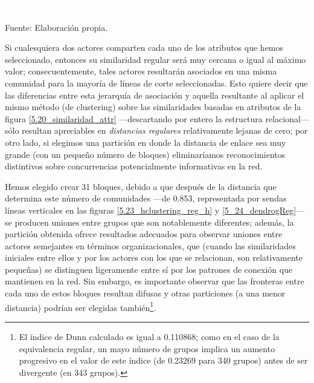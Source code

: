 \documentclass[letterpaper, 11pt]{book}
\theoremstyle{definition}
\theoremstyle{remark}
\begin{document}
\pagebreak
\hspace{-1em}\begin{minipage}{\linewidth}
\centering
{} \label{5_24_dendrogReg}

\includegraphics[scale=0.1]{img/null.png}
\vspace{53em}
\par\bigskip
\small Fuente: Elaboración propia.
\end{minipage}\bigskip



Si cualesquiera dos actores comparten cada uno de los atributos que hemos seleccionado, entonces su similaridad regular será muy cercana o igual al máximo valor; consecuentemente, tales actores resultarán asociados en una misma comunidad para la mayoría de líneas de corte seleccionadas. 
Esto quiere decir que las diferencias entre esta jerarquía de asociación y aquella resultante al aplicar el mismo método (de clustering) sobre las similaridades basadas en atributos de la figura \ref{5.20_similaridad_attr} ---descartando por entero la estructura relacional--- sólo resultan apreciables en \emph{distancias regulares} relativamente lejanas de cero; por otro lado, si elegimos una partición en donde la distancia de enlace sea muy grande (con un pequeño número de bloques) eliminaríamos reconocimientos distintivos sobre concurrencias potencialmente informativas en la red. 


Hemos elegido crear 31 bloques, debido a que después de la distancia que determina este número de comunidades ---de 0.853, representada por sendas líneas verticales en las figuras \ref{5.23_hclustering_reg_h} y \ref{5_24_dendrogReg}--- se producen uniones entre grupos que son notablemente diferentes; además, la partición obtenida ofrece resultados adecuados para observar uniones entre actores semejantes en términos organizacionales, que (cuando las similaridades iniciales entre ellos y por los actores con los que se relacionan, son relativamente pequeñas) se distinguen ligeramente entre sí por los patrones de conexión que mantienen en la red. 
Sin embargo, es importante observar que las fronteras entre cada uno de estos bloques resultan difusas y otras particiones (a una menor distancia) podrían ser elegidas también\footnote{
    El índice de Dunn calculado es igual a 0.110868; como en el caso de la equivalencia regular, un mayo número de grupos implica un aumento progresivo en el valor de este índice (de 0.23269 para 340 grupos) antes de ser divergente (en 343 grupos). 
}. 
\end{document}
